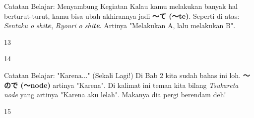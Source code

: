 \begin{lessonbox}{Catatan Belajar: Menyambung Kegiatan}
    Kalau kamu melakukan banyak hal berturut-turut, kamu bisa ubah akhirannya jadi \textbf{〜て (〜te)}. Seperti di atas: \textit{Sentaku o shi\textbf{te}}, \textit{Ryouri o shi\textbf{te}}. Artinya "Melakukan A, lalu melakukan B".
\end{lessonbox}

\begin{convobox}{13}
    \noindent
      
      

    \vspace{1.5em}
\end{convobox}

\begin{convobox}{14}
    \noindent
      

    \vspace{1.5em}
\end{convobox}

\begin{lessonbox}{Catatan Belajar: "Karena..." (Sekali Lagi!)}
    Di Bab 2 kita sudah bahas ini loh. \textbf{〜ので (〜node)} artinya "Karena". Di kalimat ini teman kita bilang \textit{Tsukareta node} yang artinya "Karena aku lelah". Makanya dia pergi berendam deh!
\end{lessonbox}

\begin{convobox}{15}
    \noindent
      

    \vspace{1.5em}
\end{convobox}

